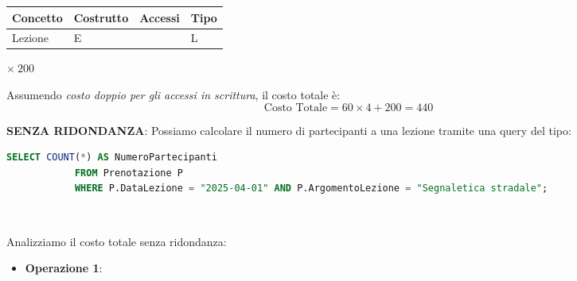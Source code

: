 \documentclass[10pt,twoside]{article}
\begin{document}
{{\begin{itemize}
            \noindent
            \begin{minipage}[t]{0.7\textwidth}
                \vspace{0pt}
                \begin{tabular}{|>{\centering\arraybackslash}p{2.6cm}|
                                >{\centering\arraybackslash}p{2cm}|
                                >{\centering\arraybackslash}p{3cm}|
                                >{\centering\arraybackslash}p{2cm}|}
                    \hline
                    \rowcolor{lightgray!40}
                    \textbf{Concetto} & \textbf{Costrutto} & \textbf{Accessi} & \textbf{Tipo} \\
                    \hline
                    \rowcolor{white!40}
                    Lezione & E & 1 & L \\
                    \hline
                \end{tabular}
            \end{minipage}%
            \begin{minipage}[t]{0.2\textwidth}
                \vspace{3.5ex}
                \begin{flushleft}
                    $\times\ 200$
                \end{flushleft}
            \end{minipage}
        \end{itemize}
        
        \vspace{1em}
        
        Assumendo \textit{costo doppio per gli accessi in scrittura}, il costo totale è:
        \[
            \text{Costo Totale} = 60 \times 4 + 200 = \boxed{440}
        \]
        
        \textbf{SENZA RIDONDANZA}: Possiamo calcolare il numero di partecipanti a una lezione tramite una query del tipo:
        

        \begin{lstlisting}[language=SQL]
            SELECT COUNT(*) AS NumeroPartecipanti
            FROM Prenotazione P 
            WHERE P.DataLezione = "2025-04-01" AND P.ArgomentoLezione = "Segnaletica stradale";\end{lstlisting}
        
        \

        Analizziamo il costo totale senza ridondanza:
        \begin{itemize}
            \item \textbf{Operazione 1}:
        

\end{itemize}}}
\end{document}
